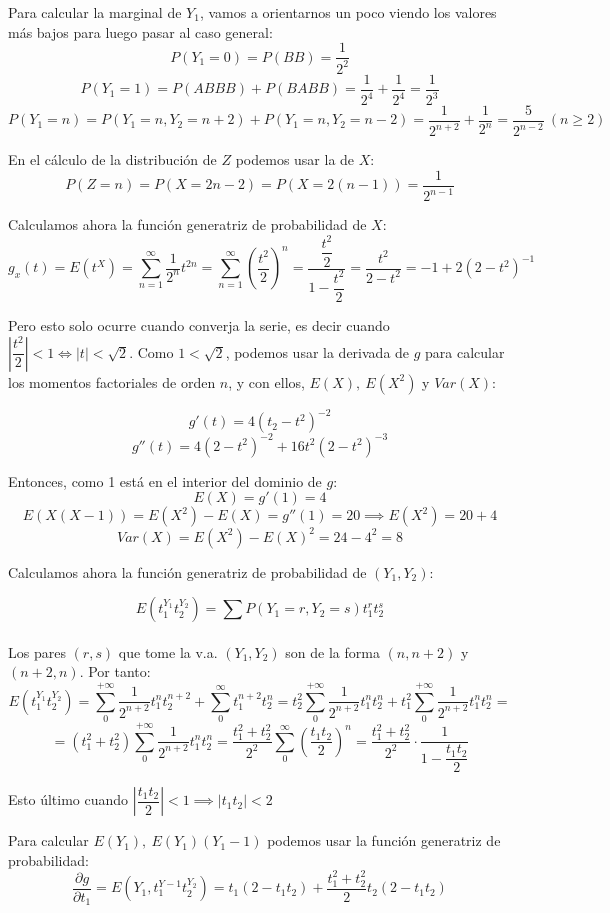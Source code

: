 \documentclass[openany]{book}
\begin{document}
\begin{exercise}
Para calcular la marginal de $ Y_1 $, vamos a orientarnos un poco viendo los valores más bajos para luego pasar al caso general:
$$ P(Y_1=0) = P(BB) = \dfrac{1}{2^{2}} $$
$$ P(Y_1 =1) = P(ABBB) + P(BABB) = \dfrac{1}{2^{4}} + \dfrac{1}{2^{4}} = \dfrac{1}{2^3} $$
$$ P(Y_1 = n) = P(Y_1=n,Y_2=n+2) + P(Y_1=n,Y_2=n-2) = \dfrac{1}{2^{n+2}}+\dfrac{1}{2^{n}} = \dfrac{5}{2^{n-2}}\ (n\geq 2) $$

En el cálculo de la distribución de $ Z $ podemos usar la de $ X $:
$$ P(Z=n) = P(X=2n-2) = P(X=2(n-1)) = \dfrac{1}{2^{n-1}} $$


Calculamos ahora la función generatriz de probabilidad de $ X $:
$$ g_{x}(t) = E(t^{X}) = \sum\limits_{n=1}^{\infty} \dfrac{1}{2^{n}}t^{2n} = \sum\limits_{n=1}^{\infty}(\dfrac{t^2}{2})^{n} = \dfrac{\dfrac{t^2}{2}}{1-\dfrac{t^2}{2}} = \dfrac{t^2}{2-t^2} = -1+2(2-t^2) ^{-1} $$

Pero esto solo ocurre cuando converja la serie, es decir cuando $ \left|\dfrac{t^2}{2}\right| < 1 \iff |t| < \sqrt{2} $. Como $ 1 < \sqrt{2} $, podemos usar la derivada de $ g $ para calcular los momentos factoriales de orden $ n $, y con ellos, $ E(X),\ E(X^2) $ y $ Var(X) $:

$$ g'(t) = 4(t_2-t^2)^{-2} $$
$$ g''(t) = 4(2-t^2)^{-2} + 16t^2 (2-t^2)^{-3} $$

Entonces, como 1 está en el interior del dominio de $ g $:
$$ E(X) = g'(1) = 4 $$
$$ E(X(X-1)) = E(X^2)-E(X) = g''(1) = 20 \implies E(X^2) = 20 + 4 $$
$$ Var(X) = E(X^2)-E(X)^2 = 24-4^2 = 8 $$

Calculamos ahora la función generatriz de probabilidad de $ (Y_1,Y_2) $:

$$ E(t_1^{Y_1}t_2^{Y_2}) = \sum\limits_{}^{}P(Y_1=r,Y_2=s)t_1^{r}t_2^{s} $$

Los pares $ (r,s) $ que tome la v.a. $ (Y_1,Y_2) $ son de la forma $ (n,n+2) $ y $ (n+2,n) $. Por tanto:
$$ E(t_1^{Y_1}t_2^{Y_2}) = \sum\limits_{0}^{+\infty}\dfrac{1}{2^{n+2}}t_1^{n}t_2^{n+2} + \sum\limits_{0}^{\infty}t_1^{n+2}t_2^{n} = t_2^2 \sum\limits_{0}^{+\infty} \dfrac{1}{2^{n+2}}t_1^{n}t_2^{n} + t_1^2\sum\limits_{0}^{+\infty} \dfrac{1}{2^{n+2}}t_1^{n}t_2^{n} =$$
$$ =  (t_1^2+t_2^2) \sum\limits_{0}^{+\infty} \dfrac{1}{2^{n+2}}t_1^{n}t_2^{n} = \dfrac{t_1^2+t_2^2}{2^2} \sum\limits_{0}^{\infty} \left( \dfrac{t_1t_2}{2} \right)^{n} = \dfrac{t_1^2+t_2^2}{2^2} \cdot \dfrac{1}{1-\dfrac{t_1t_2}{2}} $$

Esto último cuando $ |\dfrac{t_1t_2}{2}| < 1 \implies |t_1t_2| < 2 $

Para calcular $ E(Y_1),\ E(Y_1)(Y_1-1) $ podemos usar la función generatriz de probabilidad:
$$ \dfrac{\partial g}{\partial t_1} = E(Y_1,t_1^{Y-1}t_2^{Y_2}) = t_1(2-t_1t_2) + \dfrac{t_1^2+t_2^2}{2}t_2(2-t_1t_2) $$


\end{exercise}
\end{document}
